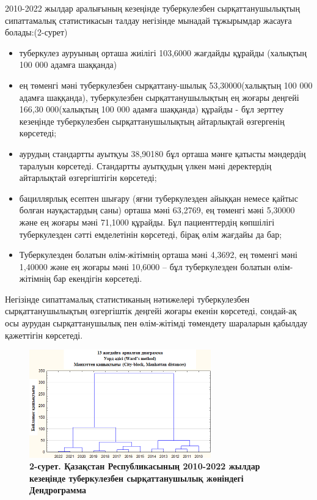 \begin{multicols}{2}

2010-2022 жылдар аралығының кезеңінде туберкулезбен сырқаттанушылықтың
сипаттамалық статистикасын талдау негізінде мынадай тұжырымдар жасауға
болады:(2-сурет)

\begin{itemize}
  \setlength{\itemindent}{1cm}
\item
  туберкулез ауруының орташа жиілігі 103,6000 жағдайды құрайды (халықтың
  100 000 адамға шаққанда)
\item
  ең төменгі мәні туберкулезбен сырқаттану-шылық 53,30000(халықтың 100
  000 адамға шаққанда), туберкулезбен сырқаттанушылықтың ең жоғары
  деңгейі 166,30 000(халықтың 100 000 адамға шаққанда) құрайды - бұл
  зерттеу кезеңінде туберкулезбен сырқаттанушылықтың айтарлықтай
  өзгергенің көрсетеді;
\item
  аурудың стандартты ауытқуы 38,90180 бұл орташа мәнге қатысты мәндердің
  таралуын көрсетеді. Стандартты ауытқудың үлкен мәні деректердің
  айтарлықтай өзгергіштігін көрсетеді;
\item
  бациллярлық есептен шығару (яғни туберкулезден айыққан немесе қайтыс
  болған науқастардың саны) орташа мәні 63,2769, ең төменгі мәні 5,30000
  және ең жоғары мәні 71,1000 құрайды. Бұл пациенттердің көпшілігі
  туберкулезден сәтті емделетінін көрсетеді, бірақ өлім жағдайы да бар;
\item
  Туберкулезден болатын өлім-жітімнің орташа мәні 4,3692, ең төменгі
  мәні 1,40000 және ең жоғары мәні 10,6000 -- бұл туберкулезден болатын
  өлім-жітімнің бар екендігін көрсетеді.
\end{itemize}

Негізінде сипаттамалық статистиканың нәтижелері туберкулезбен
сырқаттанушылықтың өзгергіштік деңгейі жоғары екенін көрсетеді,
сондай-ақ осы аурудан сырқаттанушылық пен өлім-жітімді төмендету
шараларын қабылдау қажеттігін көрсетеді.


\end{multicols}

\begin{figure}[H]
	\centering
	\includegraphics[width=0.7\textwidth]{assets/169}
	\caption*{\bfseries 2-сурет. Қазақстан Республикасының 2010-2022 жылдар кезеңінде
  туберкулезбен сырқаттанушылық жөніндегі Дендрограмма}
\end{figure}


